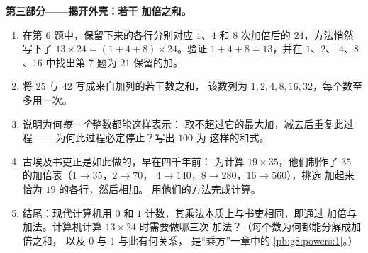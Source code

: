 \begin{problem}
\medskip
\noindent\textbf{第三部分——揭开外壳：若干
加倍之和。}
\begin{enumerate}[resume]
  \item 在第 6 题中，保留下来的各行分别对应 $1$、$4$
        和 $8$ 次加倍后的 $24$，方法悄然写下了
        $13 \times 24 = (1 + 4 + 8) \times 24$。验证
        $1 + 4 + 8 = 13$，并在 $1$、$2$、
        $4$、$8$、$16$ 中找出第 7 题为 $21$ 保留的加。
  \item 将 $25$ 与 $42$ 写成来自加列的若干数之和，
        该数列为 $1, 2, 4, 8, 16, 32$，每个数至多用一次。
  \item 说明为何\emph{每一个}整数都能这样表示：
        取不超过它的最大加，减去后重复此过程——
        为何此过程必定停止？写出 $100$ 为
        这样的和式。
  \item 古埃及书吏正是如此做的，早在四千年前：
        为计算 $19 \times 35$，他们制作了
        $35$ 的加倍表（$1 \to 35$，$2 \to 70$，
        $4 \to 140$，$8 \to 280$，$16 \to 560$），挑选
        加起来恰为 $19$ 的各行，然后相加。
        用他们的方法完成计算。
  \item 结尾：现代计算机用 $0$ 和
        $1$ 计数，其乘法本质上与书吏相同，即通过
        加倍与加法。计算机计算 $13 \times 24$ 时需要做哪三次
        加法？（每个数为何都能分解成加倍之和，
        以及 $0$ 与 $1$ 与此有何关系，
        是“乘方”一章中的
        \cref{pb:g8:powers:1}。）
\end{enumerate}
\end{problem}
